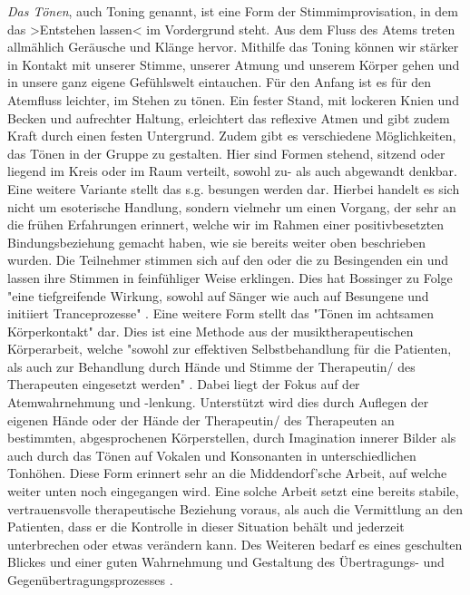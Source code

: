 \emph{Das Tönen}, auch Toning genannt, ist eine Form der Stimmimprovisation, in dem das >Entstehen lassen< im Vordergrund steht. Aus dem Fluss des Atems treten allmählich Geräusche und Klänge hervor. Mithilfe das Toning können wir stärker in Kontakt mit unserer Stimme, unserer Atmung und unserem Körper gehen und in unsere ganz eigene Gefühlswelt eintauchen. Für den Anfang ist es für den Atemfluss leichter, im Stehen zu tönen. Ein fester Stand, mit lockeren Knien und Becken und aufrechter Haltung, erleichtert das reflexive Atmen und gibt zudem Kraft durch einen festen Untergrund. Zudem gibt es verschiedene Möglichkeiten, das Tönen in der Gruppe zu gestalten. Hier sind Formen stehend, sitzend oder liegend im Kreis oder im Raum verteilt, sowohl zu- als auch abgewandt denkbar. Eine weitere Variante stellt das s.g. besungen werden dar. Hierbei handelt es sich nicht um esoterische Handlung, sondern vielmehr um einen Vorgang, der sehr an die frühen Erfahrungen erinnert, welche wir im Rahmen einer positivbesetzten Bindungsbeziehung gemacht haben, wie sie bereits weiter oben beschrieben wurden. Die Teilnehmer stimmen sich auf  den oder die zu Besingenden ein und lassen ihre Stimmen in feinfühliger Weise erklingen. Dies hat Bossinger zu Folge "eine tiefgreifende Wirkung, sowohl auf Sänger wie auch auf Besungene und initiiert Tranceprozesse" \autocite[275]{bossinger2006}. Eine weitere Form stellt das "Tönen im achtsamen Körperkontakt" \autocite [208]{rittner2008} dar. Dies ist eine Methode aus der musiktherapeutischen Körperarbeit, welche "sowohl zur effektiven Selbstbehandlung für die Patienten, als auch zur Behandlung durch Hände und Stimme der Therapeutin/ des Therapeuten eingesetzt werden" \autocite [208]{rittner2008}. Dabei liegt der Fokus auf der Atemwahrnehmung und -lenkung. Unterstützt wird dies durch Auflegen der eigenen Hände oder der Hände der Therapeutin/ des Therapeuten an bestimmten, abgesprochenen Körperstellen, durch Imagination innerer Bilder als auch durch das Tönen auf Vokalen und Konsonanten in unterschiedlichen Tonhöhen. Diese Form erinnert sehr an die Middendorf'sche Arbeit, auf welche weiter unten noch eingegangen wird. Eine solche Arbeit setzt eine bereits stabile, vertrauensvolle therapeutische Beziehung voraus, als auch die Vermittlung an den Patienten, dass er die Kontrolle in dieser Situation behält und jederzeit unterbrechen oder etwas verändern kann. Des Weiteren bedarf es eines geschulten Blickes und einer guten Wahrnehmung und Gestaltung des Übertragungs- und Gegenübertragungsprozesses \autocite[vgl.][60]{rittner2012}.


